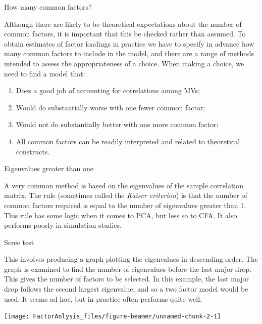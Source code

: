 \documentclass[10pt,ignorenonframetext,]{beamer}
\providecommand{\tightlist}{%
\setlength{\itemsep}{0pt}\setlength{\parskip}{0pt}}
\begin{document}
\begin{frame}{How many common factors?}

Although there are likely to be theoretical expectations about the
number of common factors, it is important that this be checked rather
than assumed. To obtain estimates of factor loadings in practice we have
to specify in advance how many common factors to include in the model,
and there are a range of methods intended to assess the appropriateness
of a choice. When making a choice, we need to find a model that:

\begin{enumerate}
\def\labelenumi{\arabic{enumi}.}
\tightlist
\item
  Does a good job of accounting for correlations among MVs;
\item
  Would do substantially worse with one fewer common factor;
\item
  Would not do substantially better with one more common factor;
\item
  All common factors can be readily interpreted and related to
  theoretical constructs.
\end{enumerate}

\end{frame}

\begin{frame}{Eigenvalues greater than one}

A very common method is based on the eigenvalues of the sample
correlation matrix. The rule (sometimes called the \emph{Kaiser
criterion}) is that the number of common factors required is equal to
the number of eigenvalues greater than 1. This rule has some logic when
it comes to PCA, but less so to CFA. It also performs poorly in
simulation studies.

\end{frame}

\begin{frame}{Scree test}

This involves producing a graph plotting the eigenvalues in descending
order. The graph is examined to find the number of eigenvalues before
the last major drop. This gives the number of factors to be selected. In
this example, the last major drop follows the second largest eigenvalue,
and so a two factor model would be used. It seems ad hoc, but in
practice often performs quite well.

\texttt{[image: FactorAnlysis\_files/figure-beamer/unnamed-chunk-2-1]}

\end{frame}
\end{document}
